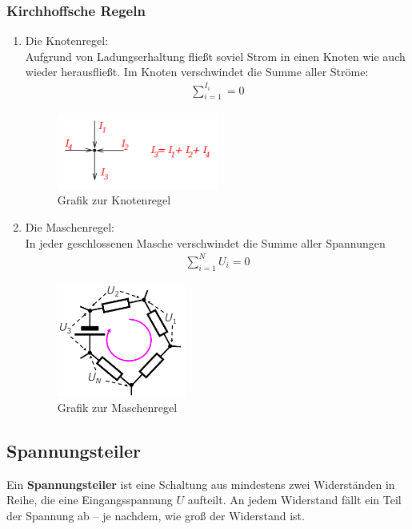 \documentclass{scrartcl}
\begin{document}
\subsubsection{Kirchhoffsche Regeln}
\begin{enumerate}
    \item Die Knotenregel:\\
        Aufgrund von Ladungserhaltung fließt soviel Strom in einen Knoten wie auch wieder herausfließt.
        Im Knoten verschwindet die Summe aller Ströme:
        \begin{align}
            \sum_{i=1}^{I_i}=0
        \end{align}
        \begin{figure}[H]
            \centering
            \includegraphics[width=0.5\textwidth]{knotenregel.png}
            \caption{Grafik zur Knotenregel}
        \end{figure}
    \item Die Maschenregel:\\
        In jeder geschlossenen Masche verschwindet die Summe aller Spannungen
        \begin{align}
            \sum_{i=1}^{N}U_i=0
        \end{align}
        \begin{figure}[H]
            \centering
            \includegraphics[width=0.4\textwidth]{Maschenregel.png}
            \caption{Grafik zur Maschenregel}
        \end{figure}
\end{enumerate}

\subsection{Spannungsteiler}
Ein \textbf{Spannungsteiler} ist eine Schaltung aus mindestens zwei Widerständen in Reihe, die eine Eingangsspannung $U$ aufteilt. An jedem Widerstand fällt ein Teil der Spannung ab – je nachdem, wie groß der Widerstand ist.
\end{document}
